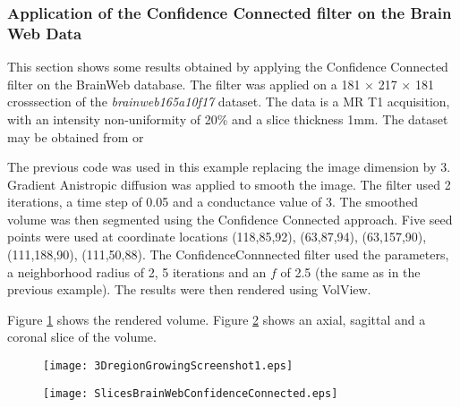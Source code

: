 \subsubsection{Application of the Confidence Connected filter on the Brain Web Data}
This section shows some results obtained by applying the Confidence Connected filter on the BrainWeb database. The filter was applied on a 181 $\times$ 217 $\times$ 181 crosssection of the {\it brainweb165a10f17} dataset. The data is a MR T1 acquisition, with an intensity non-uniformity of 20\% and a slice thickness 1mm. The dataset may be obtained from
 or

The previous code was used in this example replacing the image dimension by 3.
Gradient Anistropic diffusion was applied to smooth the image. The filter used 2 iterations, a time step of 0.05 and a conductance value of 3. The smoothed volume was then segmented using the Confidence Connected approach. Five seed points were used at coordinate locations (118,85,92), (63,87,94), (63,157,90), (111,188,90), (111,50,88). The ConfidenceConnnected filter used the parameters, a neighborhood radius of 2, 5 iterations and an $f$ of 2.5 (the same as in the previous example). The results were then rendered using VolView.

Figure \ref{fig:3DregionGrowingScreenshot1} shows the rendered volume. Figure \ref{fig:SlicesBrainWeb} shows an axial, sagittal and a coronal slice of the volume.

\begin{figure}
\centering
\texttt{[image: 3DregionGrowingScreenshot1.eps]}
\label{fig:3DregionGrowingScreenshot1}
\end{figure}

\begin{figure}
\centering
\texttt{[image: SlicesBrainWebConfidenceConnected.eps]}
\label{fig:SlicesBrainWeb}
\end{figure}
